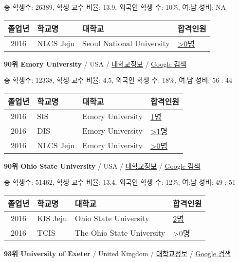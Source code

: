 \documentclass[13pt,]{article}
\begin{document}
총 학생수: 26389, 학생-교수 비율: 13.9, 외국인 학생 수: 10\%, 여:남
성비: NA

\begin{longtable}[]{@{}clll@{}}
\toprule
졸업년 & 학교명 & 대학교 & 합격인원\tabularnewline
\midrule
\endhead
2016 & NLCS Jeju & Seoul National University &
\href{http://cafe.naver.com/assarabia/11592}{\textgreater{}0명}\tabularnewline
\bottomrule
\end{longtable}

\textbf{90위 Emory University} / USA /
\href{https://www.timeshighereducation.com/world-university-rankings/emory-university?ranking-dataset=133819}{대학교정보}
/ \href{http://www.google.com/search?q=Emory+University}{Google 검색}

총 학생수: 12338, 학생-교수 비율: 4.5, 외국인 학생 수: 18\%, 여:남 성비:
56 : 44

\begin{longtable}[]{@{}clll@{}}
\toprule
졸업년 & 학교명 & 대학교 & 합격인원\tabularnewline
\midrule
\endhead
2016 & SIS & Emory University &
\href{http://cafe.naver.com/assarabia/11589}{1명}\tabularnewline
2016 & DIS & Emory University &
\href{http://cafe.naver.com/assarabia/11591}{\textgreater{}1명}\tabularnewline
2016 & NLCS Jeju & Emory University &
\href{http://cafe.naver.com/assarabia/11592}{\textgreater{}0명}\tabularnewline
\bottomrule
\end{longtable}

\textbf{90위 Ohio State University} / USA /
\href{https://www.timeshighereducation.com/world-university-rankings/ohio-state-university?ranking-dataset=133819}{대학교정보}
/ \href{http://www.google.com/search?q=Ohio+State+University}{Google
검색}

총 학생수: 51462, 학생-교수 비율: 13.4, 외국인 학생 수: 12\%, 여:남
성비: 49 : 51

\begin{longtable}[]{@{}clll@{}}
\toprule
졸업년 & 학교명 & 대학교 & 합격인원\tabularnewline
\midrule
\endhead
2016 & KIS Jeju & Ohio State University &
\href{http://cafe.naver.com/assarabia/11596}{2명}\tabularnewline
2016 & TCIS & The Ohio State University &
\href{http://cafe.naver.com/assarabia/11598}{\textgreater{}0명}\tabularnewline
\bottomrule
\end{longtable}

\textbf{93위 University of Exeter} / United Kingdom /
\href{https://www.timeshighereducation.com/world-university-rankings/university-of-exeter?ranking-dataset=133819}{대학교정보}
/ \href{http://www.google.com/search?q=University+of+Exeter}{Google
검색}
\end{document}
